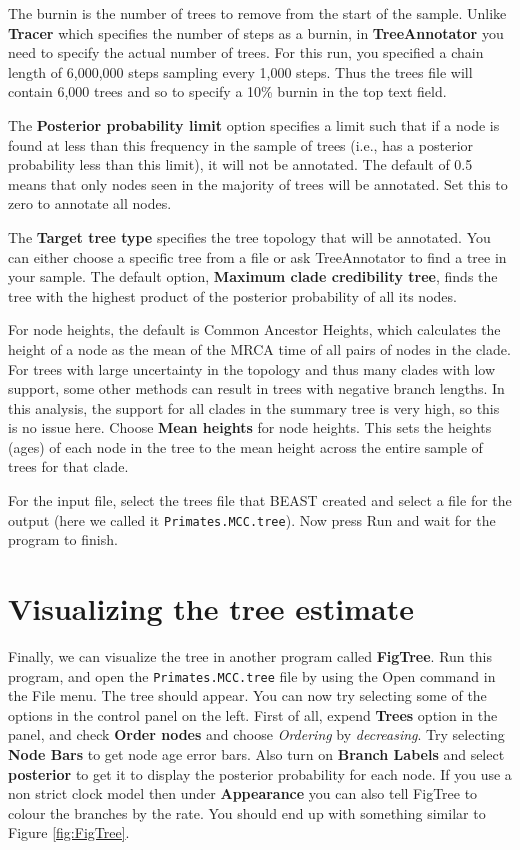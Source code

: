 \documentclass[12pt]{article}
\newcommand{\chainLength}{{6,000,000}}
\newcommand{\logEvery}{{1,000}}
\newcommand{\tracesNumber}{{6,000}} %
\newcommand{\mccTree}{{\texttt{Primates.MCC.tree}}}
\begin{document}
The burnin is the number of trees to remove from the start of the sample. Unlike {\bf Tracer} which specifies the number of
steps as a burnin, in {\bf TreeAnnotator} you need to specify the actual number of trees. For this run, you specified a chain
length of \chainLength{} steps sampling every \logEvery{} steps. Thus the trees file will contain \tracesNumber{} trees and so to specify a 10\% burnin
in the top text field.

The {\bf Posterior probability limit} option specifies a limit such that if a node is found at less than this frequency in the sample
of trees (i.e., has a posterior probability less than this limit), it will not be annotated. The default of 0.5 means that only nodes
seen in the majority of trees will be annotated. Set this to zero to annotate all nodes.

The {\bf Target tree type} specifies the tree topology that will be annotated. You can either choose a specific tree from a file or ask TreeAnnotator to find a tree in your sample.
The default option, {\bf Maximum clade credibility tree}, finds the tree with the highest product of the posterior probability of
all its nodes.

For node heights, the default is Common Ancestor Heights, which calculates
the height of a node as the mean of the MRCA time of all pairs of nodes in
the clade. For trees with large uncertainty in the topology and thus many clades
with low support, some other methods can result in trees with negative branch
lengths. In this analysis, the support for all clades in the summary tree is very
high, so this is no issue here.
Choose {\bf Mean heights} for node heights. This sets the heights (ages) of each node in the tree to the mean height across the
entire sample of trees for that clade.

For the input file, select the trees file that BEAST created and select a file for the
output (here we called it \mccTree{}). Now press Run and wait for the program to finish.

\section{Visualizing the tree estimate}

Finally, we can visualize the tree in another program called {\bf FigTree}. Run this program, and open
the \mccTree{} file by using the Open command in the File menu. The tree should appear.
You can now try selecting some of the options in the control panel on the left. 
First of all, expend {\bf Trees} option in the panel, and check {\bf Order nodes} and choose \textit{Ordering} by \textit{decreasing}. 
Try selecting {\bf Node Bars} to get node age error bars. Also turn on {\bf Branch Labels} and select {\bf posterior} to get
it to display the posterior probability for each node. 
If you use a non strict clock model then under {\bf Appearance} you can also tell FigTree to colour the branches by the rate.
You should end up with something similar to Figure \ref{fig:FigTree}.
\end{document}
